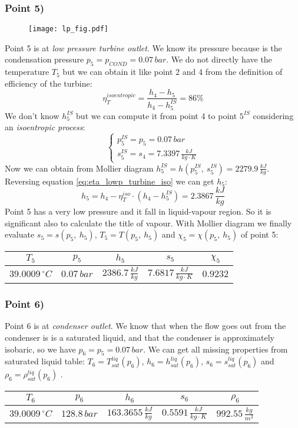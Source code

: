 \documentclass[a4paper,12pt]{article}
\newcommand{\celsius}[0]{\,^{\circ}C}
\newcommand{\kjkg}[0]{\,\frac{kJ}{kg}}
\newcommand{\kjkgk}[0]{\,\frac{kJ}{kg \cdot K}}
\newcommand{\kgmcube}[0]{\,\frac{kg}{m^3}}
\newcommand{\md}[0]{Mollier diagram }
\newcommand{\pointdatatablechi}[6]{
\begin{center}
\tabulinesep=1.2mm
\begin{tabu}{|c|c|c|c|c|}
\hline
$ T_{#1} $ & $ p_{#1} $ & $ h_{#1} $ & $ s_{#1} $ & $ \chi_{#1} $\\ \hline
$ #2 \celsius $ & $ #3 \,bar $ & $ #4 \kjkg $ & $ #5 \kjkgk $ & $ #6 $\\ \hline
\end{tabu}
\end{center}
}
\newcommand{\pointdatatablerho}[6]{
\begin{center}
\tabulinesep=1.2mm
\begin{tabu}{|c|c|c|c|c|}
\hline
$ T_{#1} $ & $ p_{#1} $ & $ h_{#1} $ & $ s_{#1} $ & $ \rho_{#1} $\\ \hline
$ #2 \celsius $ & $ #3 \,bar $ & $ #4 \kjkg $ & $ #5 \kjkgk $ & $ #6 \kgmcube $\\ \hline
\end{tabu}
\end{center}
}
\begin{document}
\subsubsection*{Point 5)}
\begin{wrapfigure}{L}{3cm}
    \texttt{[image: lp\_fig.pdf]}
\end{wrapfigure}
Point 5 is at \emph{low pressure turbine outlet}. We know its pressure because is the condensation pressure $p_5=p_{COND}=0.07\,bar$. We do not directly have the temperature $T_5$ but we can obtain it like point 2 and 4 from the definition of efficiency of the turbine:
\begin{equation}
\label{eq:eta_lowp_turbine_iso}
\eta_T^{isoentropic} = \frac{h_4-h_5}{h_4-h_5^{IS}} = 86\%
\end{equation}
We don't know $h_5^{IS}$ but we can compute it from point 4 to point $5^{IS}$ considering an \emph{isoentropic process}:
\[\begin{cases}{}
p_5^{IS} = p_5 = 0.07 \,bar \\ 
s_5^{IS} = s_4 = 7.3397 \kjkgk
\end{cases}\]
Now we can obtain from \md $h_5^{IS} = h(p_5^{IS},\ s_5^{IS}) = 2279.9 \kjkg$.
\\Reversing equation \ref{eq:eta_lowp_turbine_iso} we can get $h_5$:
\begin{equation}
h_5=h_4-\eta_T^{iso} \cdot \left(h_4 - h_5^{IS} \right) = 2.3867 \kjkg
\end{equation}
Point 5 has a very low pressure and it fall in liquid-vapour region. So it is significant also to calculate the title of vapour.
With \md we finally evaluate $s_5 = s(p_5,\ h_5)$, $T_5 = T(p_5,\ h_5)$ and $\chi_5 = \chi(p_5,\ h_5)$ of point 5:
\pointdatatablechi{5}{39.0009}{0.07}{2386.7}{7.6817}{0.9232}
%
%
%
\subsubsection*{Point 6)}
Point 6 is at \emph{condenser outlet}. We know that when the flow goes out from the condenser is is a saturated liquid, and that the condenser is approximately isobaric, so we have $p_6=p_5=0.07\, bar$. We can get all missing properties from saturated liquid table: $T_6 = T^{liq}_{sat}(p_6)$, $h_6 = h^{liq}_{sat}(p_6)$, $s_6 = s^{liq}_{sat}(p_6)$ and $\rho_6 = \rho^{liq}_{sat}(p_6)$ .
\pointdatatablerho{6}{39.0009}{128.8}{163.3655}{0.5591}{992.55}
%
%
%
\end{document}
